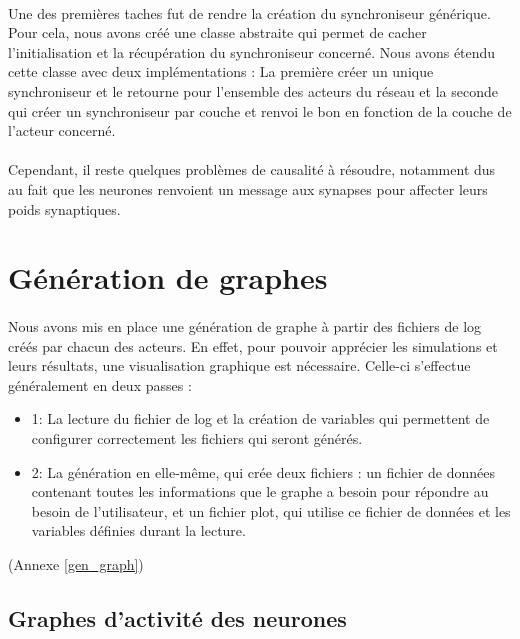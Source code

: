 \documentclass[a4paper,10pt]{article}
\begin{document}
\paragraph{}
Une des premières taches fut de rendre la création du synchroniseur générique. Pour cela, nous avons créé une classe abstraite qui permet de cacher l'initialisation et la récupération du synchroniseur concerné. Nous avons étendu cette classe avec deux implémentations : La première créer un unique synchroniseur et le retourne pour l'ensemble des acteurs du réseau et la seconde qui créer un synchroniseur par couche et renvoi le bon en fonction de la couche de l'acteur concerné.

\paragraph{}
Cependant, il reste quelques problèmes de causalité à résoudre, notamment dus au fait que les neurones renvoient un message aux synapses pour affecter leurs poids synaptiques.

\newpage

\section{Génération de graphes}

\paragraph{}
Nous avons mis en place une génération de graphe à partir des fichiers de log créés par chacun des acteurs. En effet, pour pouvoir apprécier les simulations et leurs résultats, une visualisation graphique est nécessaire.
Celle-ci s'effectue généralement en deux passes : 

\begin{itemize}
	\item{1}: La lecture du fichier de log et la création de variables qui permettent de configurer correctement les fichiers qui seront générés.
	\item{2}: La génération en elle-même, qui crée deux fichiers : un fichier de données contenant toutes les informations que le graphe a besoin pour répondre au besoin de l'utilisateur, et un fichier plot, qui utilise ce fichier de données et les variables définies durant la lecture.
\end{itemize}
(Annexe \ref{gen_graph})

\subsection{Graphes d’activité des neurones}
\end{document}
